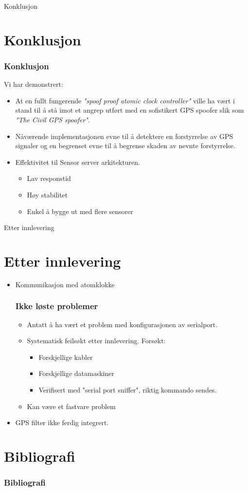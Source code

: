 \documentclass[xcolor=table]{beamer}
\begin{document}
\begin{frame}
\centering
Konklusjon
\end{frame}

\section{Konklusjon}
\begin{frame}
  \frametitle{Konklusjon}
  Vi har demonstrert:
  \begin{itemize}
    \item At en fullt fungerende \textit{"spoof proof atomic clock controller"} ville ha vært i stand til å stå imot et angrep utført med en sofistikert GPS spoofer slik som \textit{"The Civil GPS spoofer"}.
    \item Nåværende implementasjonen evne til å detektere en forstyrrelse av GPS signaler og en begrenset evne til å begrense skaden av nevnte forstyrrelse.
    \item Effektivitet til Sensor server arkitekturen. 
    \begin{itemize}
      \item Lav responstid
      \item Høy stabilitet 
      \item Enkel å bygge ut med flere sensorer
    \end{itemize}
  \end{itemize}
\end{frame}

\begin{frame}
\centering
Etter innlevering
\end{frame}

\section{Etter innlevering}
\begin{frame}
  \begin{itemize}
  \item Kommunikasjon med atomklokke
    \frametitle{Ikke løste problemer}
    \begin{itemize}
      \item Antatt å ha vært et problem med konfigurasjonen av serialport.
      \item Systematisk feilsøkt etter innlevering. Forsøkt:
      \begin{itemize}
        \item Forskjellige kabler
        \item Forskjellige datamaskiner
        \item Verifisert med "serial port sniffer", riktig kommando sendes.
      \end{itemize}
      \item Kan være et fastvare problem
    \end{itemize}
  \item GPS filter ikke ferdig integrert.
  \end{itemize}
\end{frame}

\section{Bibliografi}
\begin{frame}[allowframebreaks]%
  \frametitle{Bibliografi}
  \printbibliography[heading=bibintoc]
\end{frame}
\end{document}
